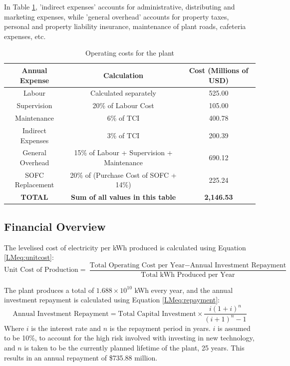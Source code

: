 In Table \ref{LMtable:opcosts}, 'indirect expenses' accounts for administrative, distributing and marketing expenses, while 'general overhead' accounts for property taxes, personal and property liability insurance, maintenance of plant roads, cafeteria expenses, etc.


\begin{table}[h]
\centering
\caption{Operating costs for the plant}
\label{LMtable:opcosts}
\begin{tabular}{|c|c|c|}
\hline
\textbf{Annual Expense} & \textbf{Calculation}                       & \textbf{Cost (Millions of USD)} \\ \hline
Labour                  & Calculated separately                      & 525.00           \\ \hline
Supervision             & 20\% of Labour Cost                        & 105.00           \\ \hline
Maintenance             & 6\% of TCI                                 & 400.78           \\ \hline
Indirect Expenses       & 3\% of TCI                                 & 200.39           \\ \hline
General Overhead        & 15\% of Labour + Supervision + Maintenance & 690.12           \\ \hline
SOFC Replacement        & 20\% of (Purchase Cost of SOFC + 14\%)     & 225.24           \\ \hline
\textbf{TOTAL}          & \textbf{Sum of all values in this table}   & \textbf{2,146.53} \\ \hline
\end{tabular}
\end{table}



\subsection{Financial Overview}

The levelised cost of electricity per kWh produced is calculated using Equation \ref{LMeq:unitcost}:
\begin{equation}
    \text{Unit Cost of Production} = \frac{\text{Total Operating Cost per Year} - \text{Annual Investment Repayment}}{\text{Total kWh Produced per Year}}
    \label{LMeq:unitcost}
\end{equation}

The plant produces a total of $\text{1.688} \times \text{10}^{\text{10}}$ kWh every year, and the annual investment repayment is calculated using Equation \ref{LMeq:repayment}:
\begin{equation}
    \text{Annual Investment Repayment} = \text{Total Capital Investment}\times\frac{i(1+i)^{n}}{(i+1)^{n} - 1}
    \label{LMeq:repayment}
\end{equation}
Where $i$ is the interest rate and $n$ is the repayment period in years. $i$ is assumed to be 10\%, to account for the high risk involved with investing in new technology, and $n$ is taken to be the currently planned lifetime of the plant, 25 years. This results in an annual repayment of \$735.88 million.
\\

